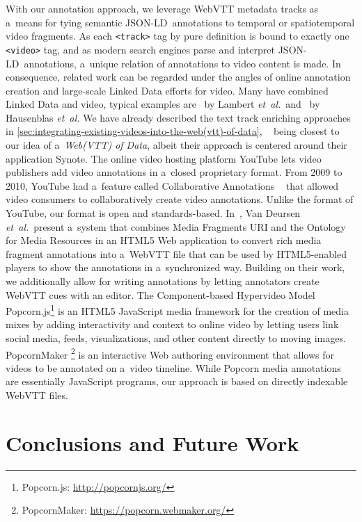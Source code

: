 \documentclass{sig-alternate}
\newcommand{\inlinelistingsize}{\fontsize{8pt}{11pt}}
\let\oldurl\url
\renewcommand{\url}[1]{\inlinelistingsize\oldurl{#1}}
\def\JSONLD{\mbox{JSON-LD}}
\begin{document}
With our annotation approach, we leverage WebVTT
me\-tadata tracks as a~means for tying semantic \JSONLD\ annotations
to temporal or spatiotemporal video fragments.
As each \texttt{<track>} tag by pure definition is bound to
exactly one \texttt{<video>} tag, and as modern search engines
parse and interpret \JSONLD\ annotations,
a~unique relation of annotations to video content is made.
In consequence, related work can be regarded under the angles
of online annotation creation and large-scale Linked Data 
efforts for video.
Many have combined Linked Data and video,
typical examples are~\cite{lambert2010linkeddata} by Lambert \emph{et~al.}\
and~\cite{hausenblas2009im} by Hausenblas \emph{et~al.}
We have already described the text track enriching approaches~\cite{li2013enriching,li2012creating,yi2012synote,steiner2010semwebvid}
in \autoref{sec:integrating-existing-videos-into-the-web(vtt)-of-data},%
~\cite{yi2012synote} being closest to our idea of a~\emph{Web(VTT) of Data},
albeit their approach is centered around their application Synote.
The online video hosting platform YouTube
lets video publishers add video annotations
in a~closed proprietary format.
From 2009 to 2010, YouTube had a~feature called
Collaborative Annotations%
~\cite{fink2009collaborativeannotations}
that allowed video consumers to collaboratively
create video annotations.
Unlike the format of YouTube, our format is open and standards-based.
In~\cite{vandeursen2012mediafragmentannotations},
Van Deursen \emph{et~al.}\ present a~system
that combines Media Fragments URI
and the Ontology for Media Resources
in an HTML5
Web application to convert rich media fragment annotations
into a~WebVTT file
that can be used by HTML5-enabled players
to show the annotations in a~synchronized way.
Building on their work,
we additionally allow for writing annotations by
letting annotators create WebVTT cues with an editor.
The Component-based Hypervideo Model
Popcorn.js\footnote{Popcorn.js: \url{http://popcornjs.org/}}
is an HTML5 JavaScript media framework
for the creation of media mixes
by adding interactivity and context to online video
by letting users link social media, feeds,
visualizations, and other content directly to moving images.
PopcornMaker%
\footnote{PopcornMaker: \url{https://popcorn.webmaker.org/}}
is an interactive Web authoring environment
that allows for videos to be annotated on a~video timeline.
While Popcorn media annotations are essentially JavaScript programs,
our approach is based on directly indexable WebVTT files.

\section{Conclusions and Future Work}
\label{sec:conclusions-and-future-work}
\end{document}
